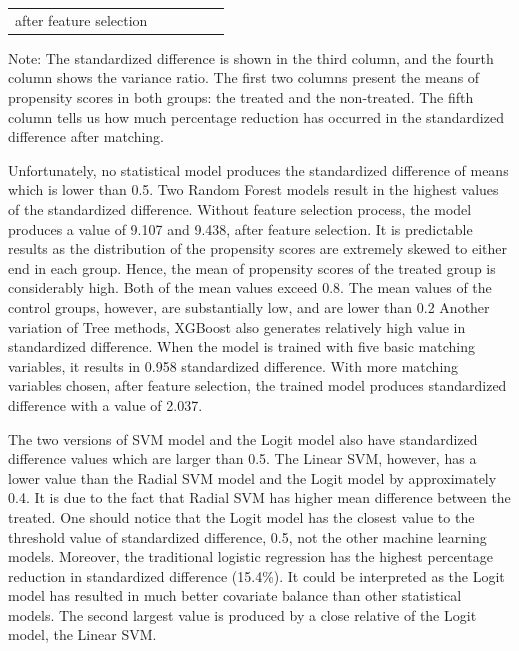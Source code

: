 \documentclass[11pt,a4paper,oneside]{article}
\begin{document}
\begin{table}[t!]
\begin{threeparttable}
{\begin{tabular}{*6c}
		\multicolumn{1}{l}{\multirow{2}{*}{after feature selection}} & \multicolumn{1}{r}{\multirow{2}{*}{}} & \multicolumn{1}{r}{\multirow{2}{*}{}} & \multicolumn{1}{r}{\multirow{2}{*}{}} &  \multicolumn{1}{r}{\multirow{2}{*}{}} & \multicolumn{1}{r}{\multirow{2}{*}{}}\\\\
		\bottomrule
	\end{tabular}
	}
	\begin{tablenotes}
	    \linespread{1}\footnotesize
	    Note: The standardized difference is shown in the third column, and the fourth column shows the variance ratio. The first two columns present the means of propensity scores in both groups: the treated and the non-treated. The fifth column tells us how much percentage reduction has occurred in the standardized difference after matching.
	\end{tablenotes}
	\end{threeparttable}
	\label{table:4}
\end{table}
\par
Unfortunately, no statistical model produces the standardized difference of means which is lower than 0.5.  Two Random Forest models result in the highest values of the standardized difference. Without feature selection process, the model produces a value of 9.107 and 9.438, after feature selection. It is predictable results as the distribution of the propensity scores are extremely skewed to either end in each group. Hence, the mean of propensity scores of the treated group is considerably high. Both of the mean values exceed 0.8. The mean values of the control groups, however, are substantially low, and are lower than 0.2 Another variation of Tree methods, XGBoost also generates relatively high value in standardized difference. When the model is trained with five basic matching variables, it results in 0.958 standardized difference. With more matching variables chosen, after feature selection, the trained model produces standardized difference with a value of 2.037. 
\par
The two versions of SVM model and the Logit model also have standardized difference values which are larger than 0.5. The Linear SVM, however, has a lower value than the Radial SVM model and the Logit model by approximately 0.4. It is due to the fact that Radial SVM has higher mean difference between the treated. One should notice that the Logit model has the closest value to the threshold value of standardized difference, 0.5, not the other machine learning models. Moreover, the traditional logistic regression has the highest percentage reduction in standardized difference (15.4\%). It could be interpreted as the Logit model has resulted in much better covariate balance than other statistical models. The second largest value is produced by a close relative of the Logit model, the Linear SVM.
\end{document}
